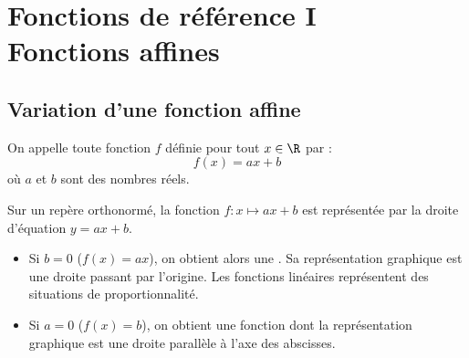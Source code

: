 \documentclass[10pt,openright,twoside,french]{book}
\begin{document}
\renewcommand\PartProgramme{Fonctions}
\chapter[Fonctions affines]{Fonctions de référence I\\ Fonctions affines}\label{ch_fonctions_affines}

\section{Variation d'une fonction affine}

\begin{Defi}
    On appelle  toute fonction $f$ définie pour tout $x \in \R$ par : \[f(x) = ax + b\] où $a$ et $b$ sont des nombres réels.
\end{Defi}

\begin{Prop}
    Sur un repère orthonormé, la fonction $f \colon x \mapsto ax + b$ est représentée par la droite d'équation $y = ax + b$.
\end{Prop}

\begin{Rmq}[s]
    \begin{itemize}
        \item Si $b = 0$ ($f(x) = ax$), on obtient alors une . Sa représentation graphique est une droite passant par l'origine. Les fonctions linéaires représentent des situations de proportionnalité.
        \item Si $a = 0$ ($f(x) = b$), on obtient une fonction  dont la représentation graphique est une droite parallèle à l'axe des abscisses.
    \end{itemize}
\end{Rmq}
\end{document}
